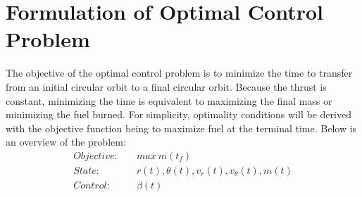 \documentclass[]{article}
\begin{document}
\section{Formulation of Optimal Control Problem}
The objective of the optimal control problem is to minimize the time to transfer from an initial circular orbit to a final circular orbit. Because the thrust is constant, minimizing the time is equivalent to maximizing the final mass or minimizing the fuel burned. For simplicity, optimality conditions will be derived with the objective function being to maximize fuel at the terminal time. Below is an overview of the problem:
\begin{align*}
	Objective:& \quad max\ m(t_f) \\
	State:&     \quad r(t), \theta(t), v_r(t), v_\theta(t), m(t) \\
	Control:&   \quad \beta(t)
\end{align*}
\end{document}
